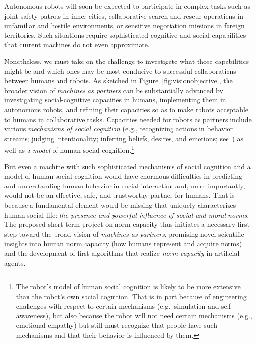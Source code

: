\documentclass[12pt]{article}
\begin{document}


\vskip 0.1in
\vskip 0.1in

\noindent Autonomous robots will soon be expected to participate in
complex tasks such as joint safety patrols in inner cities,
collaborative search and rescue operations in unfamiliar and hostile
environments, or sensitive negotiation missions in foreign
territories.  Such situations require sophisticated cognitive and
social capabilities that current machines do not even approximate.

Nonetheless, we must take on the challenge to investigate what those
capabilities might be and which ones may be most conducive to
successful collaborations between humans and robots.  As sketched in
Figure~\ref{fig:visionobjective},
the broader vision of {\em machines as partners} can be substantially
advanced by investigating social-cognitive capacities in humans,
implementing them in autonomous robots, and refining their capacities
so as to make robots acceptable to humans in collaborative tasks.
Capacities needed for robots as partners include various {\em
mechanisms of social cognition} (e.g., recognizing actions in behavior streams; judging intentionality; inferring beliefs, desires, and emotions; see~\citep{malle_tree_2015}) as well as {\em a
  model} of human social cognition.\footnote{ The robot's model of
  human social cognition is likely to be more extensive than the
  robot's own social cognition. That is in part because of engineering
  challenges with respect to certain mechanisms (e.g., simulation and
  self-awareness), but also because the robot will not need certain
  mechanisms (e.g., emotional empathy) but still must recognize that
  people have such mechanisms and that their behavior is influenced by
  them.}

But even a machine with such sophisticated mechanisms of social cognition
and a model of human social cognition would have enormous difficulties
in predicting and understanding human behavior in social interaction
and, more importantly, would not be an effective, safe, and
trustworthy partner for humans.  That is because a fundamental element
would be missing that uniquely characterizes human social life: {\em
  the presence and powerful influence of social and moral norms}.  The
proposed short-term project on norm capacity thus initiates a
necessary first step toward the broad vision of {\em machines as
  partners}, promising novel scientific insights into human norm
capacity (how humans represent and acquire norms) and the development
of first algorithms that realize {\em norm capacity} in artificial
agents.
\end{document}
